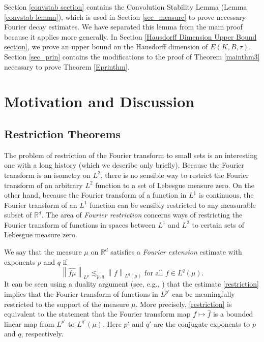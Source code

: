 \documentclass{amsart}
\numberwithin{equation}{section}
\theoremstyle{definition}
\theoremstyle{definition}
\def\RR{\mathbb{R}}
\newcommand{\norm}[1]{\left\|#1\right\|}
\begin{document}
Section \ref{convstab section} contains the Convolution Stability Lemma (Lemma \ref{convstab lemma}),  which is used in Section \ref{sec_measure} to prove necessary Fourier decay estimates. We have separated  this lemma from the main proof because it applies more  generally. 
In Section \ref{Hausdorff Dimension Upper Bound section}, we prove an upper bound on the Hausdorff dimension of $E(K,B,\tau)$. 
Section \ref{sec_prin} contains the modifications to the proof of Theorem \ref{mainthm3} necessary to prove Theorem \ref{Eprinthm}.


\section{Motivation and Discussion}\label{motivation}

\subsection{Restriction Theorems}\label{restriction theorems}

The problem of restriction of the Fourier transform to small sets is an interesting one with a long history (which we describe only briefly). Because the Fourier transform is an isometry on $L^2$, there is no sensible way to restrict the Fourier transform of an arbitrary $L^2$ function to a set of Lebesgue measure zero. 
On the other hand, because the Fourier transform of a function in $L^1$ is continuous, 
the Fourier transform of an $L^1$ function can be sensibly restricted to any measurable subset of $\mathbb{R}^d$. The area of \textit{Fourier restriction} concerns ways of restricting the Fourier transform of  
functions in spaces between  $L^1$ and $L^2$
to certain sets of Lebesgue measure zero. 


We say that the measure $\mu$ on $\RR^d$  satisfies a \textit{Fourier extension} estimate with exponents $p$ and $q$ if
\begin{equation}\label{restriction}
\norm{\widehat{f \mu}}_{L^p} \lesssim_{p,q} 
\norm{f}_{L^q(\mu)}
\text{  for all $f \in L^q(\mu)$.}
\end{equation}
%
It can be seen using a duality argument (see, e.g., \cite{mattila-book-2}) that the estimate \eqref{restriction} implies that the Fourier transform of functions in $L^{p'}$ can be meaningfully restricted to the support of the measure $\mu$. More precisely, \eqref{restriction} is equivalent to the statement that the Fourier transform map $f \mapsto \widehat{f}$ is a bounded linear map from $L^{p'}$ to $L^{q'}(\mu)$. 
Here $p'$ and $q'$ are the conjugate exponents to $p$ and $q$, respectively. 
\end{document}
